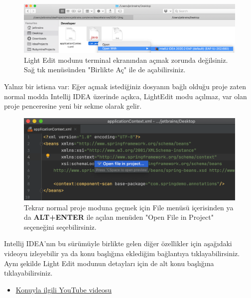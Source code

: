 \documentclass[11pt]{article}
\begin{document}
\begin{figure}[htbp]
\centering
\includegraphics[width=.9\linewidth]{gorseller/intellij-idea-lightedit-sag-tik.png}
\caption{Light Edit modunu terminal ekranından açmak zorunda değilsiniz. Sağ tık menüsünden "Birlikte Aç" ile de açabilirsiniz.}
\end{figure}

Yalnız bir istisna var: Eğer açmak istediğiniz dosyanın bağlı olduğu proje
zaten normal modda Intellij IDEA üzerinde açıkca, LightEdit modu açılmaz, var
olan proje penceresine yeni bir sekme olarak gelir.

\begin{figure}[htbp]
\centering
\includegraphics[width=.9\linewidth]{gorseller/intellij-idea-light-editproject-mode.png}
\caption{Tekrar normal proje moduna geçmek için File menüsü içerisinden ya da \textbf{ALT+ENTER} ile açılan menüden "Open File in Project" seçeneğini seçebilirsiniz.}
\end{figure}
\newpage
Intellij IDEA'nın bu sürümüyle birlikte gelen diğer özellikler için aşağıdaki
videoyu izleyebilir ya da konu başlığına eklediğim bağlantıya
tıklayabilirsiniz. Aynı şekilde Light Edit modunun detayları için de alt konu
başlığına tıklayabilirsiniz.

\begin{itemize}
\item \href{https://www.youtube.com/watch?v=LtOH7snHBCA}{Konuyla ilgili YouTube videosu}
\newpage
\end{itemize}
\end{document}
